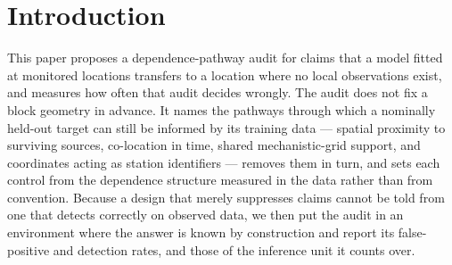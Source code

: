 \section{Introduction}

This paper proposes a dependence-pathway audit for claims that a model fitted at monitored locations transfers to a location where no local observations exist, and measures how often that audit decides wrongly. The audit does not fix a block geometry in advance. It names the pathways through which a nominally held-out target can still be informed by its training data --- spatial proximity to surviving sources, co-location in time, shared mechanistic-grid support, and coordinates acting as station identifiers --- removes them in turn, and sets each control from the dependence structure measured in the data rather than from convention. Because a design that merely suppresses claims cannot be told from one that detects correctly on observed data, we then put the audit in an environment where the answer is known by construction and report its false-positive and detection rates, and those of the inference unit it counts over.

